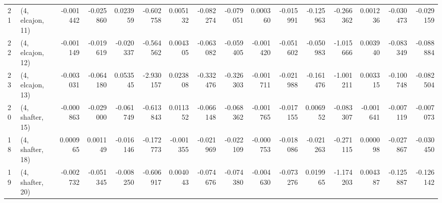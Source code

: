 \begin{tabular}{llrrrrrrrrrrrrrr}
21 &  (4, elcajon, 11) &  -0.001442 & -0.025860 &  0.023959 &  -0.602758 &  0.005132 &  -0.082274 & -0.079051 &  0.000360 & -0.015991 & -0.125963 &  -0.266362 &  0.001236 & -0.030473 & -0.029159 \\
22 &  (4, elcajon, 12) &  -0.001149 & -0.019619 & -0.020337 &  -0.564562 &  0.004305 &  -0.063082 & -0.059405 & -0.001420 & -0.051602 & -0.050983 &  -1.015666 &  0.003940 & -0.083349 & -0.088884 \\
23 &  (4, elcajon, 13) &  -0.003031 & -0.064180 &  0.053545 &  -2.930157 &  0.023808 &  -0.332476 & -0.326303 & -0.001711 & -0.021988 & -0.161476 &  -1.001211 &  0.003315 & -0.100748 & -0.082504 \\
20 &  (4, shafter, 15) &  -0.000863 & -0.029000 & -0.061749 &  -0.613843 &  0.011352 &  -0.066148 & -0.068362 & -0.001765 & -0.017155 &  0.006952 &  -0.083307 & -0.001641 & -0.007119 & -0.007073 \\
18 &  (4, shafter, 18) &   0.000965 &  0.001149 & -0.016146 &  -0.172773 & -0.001355 &  -0.021969 & -0.022109 & -0.000753 & -0.018086 & -0.021263 &  -0.271115 &  0.000098 & -0.027867 & -0.030450 \\
19 &  (4, shafter, 20) &  -0.002732 & -0.051345 & -0.008250 &  -0.606917 &  0.004043 &  -0.074676 & -0.074380 & -0.004630 & -0.073276 &  0.019965 &  -1.174203 &  0.004387 & -0.125887 & -0.126142 \\
\bottomrule
\end{tabular}
